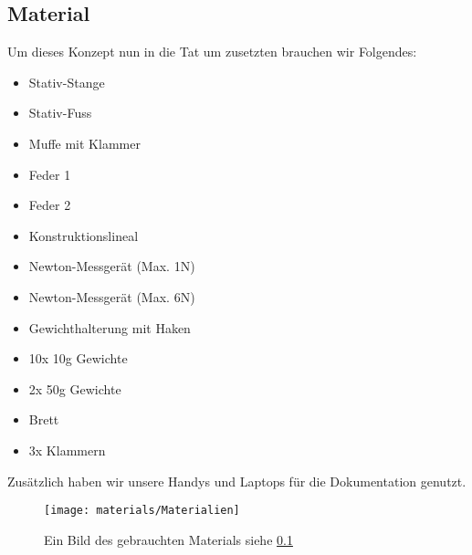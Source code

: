 \documentclass[../main.tex]{subfiles} %
\begin{document}
        \subsection{Material}\label{subsec:material}

            Um dieses Konzept nun in die Tat um zusetzten brauchen wir Folgendes:
            \begin{itemize}
                \item \hypertarget{stativ-stange}{}Stativ-Stange \label{stativ-stange}
                \item \hypertarget{stativ-fuss}{}Stativ-Fuss \label{stativ-fuss}
                \item \hypertarget{muffe-mit-klammer}{}Muffe mit Klammer \label{muffe-mit-klammer}
                \item \hypertarget{feder-1}{}Feder 1 \label{feder-1}
                \item \hypertarget{feder-2}{}Feder 2 \label{feder-2}
                \item \hypertarget{konstruktionslineal}{}Konstruktionslineal \label{konstruktionslineal}
                \item \hypertarget{newton-messgerat-max-1n}{}Newton-Messgerät (Max. 1N) \label{newton-messgerat-max-1n}
                \item \hypertarget{newton-messgerat-max-6n}{}Newton-Messgerät (Max. 6N) \label{newton-messgerat-max-6n}
                \item \hypertarget{gewichthalterung-mit-haken}{}Gewichthalterung mit Haken \label{gewichthalterung-mit-haken}
                \item \hypertarget{10x-10g-gewichte}{}10x 10g Gewichte \label{10x-10g-gewichte}
                \item \hypertarget{2x-50g-gewichte}{}2x 50g Gewichte \label{2x-50g-gewichte}
                \item \hypertarget{brett}{}Brett \label{brett}
                \item \hypertarget{3x-klammern}{}3x Klammern \label{3x-klammern}
            \end{itemize}
            \noindent
            Zusätzlich haben wir unsere Handys und Laptops für die Dokumentation genutzt.

            \begin{figure}[H]
                \centering
                \texttt{[image: materials/Materialien]}
                \caption{Ein Bild des gebrauchten Materials siehe \ref{subsec:material}}
                \label{fig:material}
            \end{figure}
\end{document}
